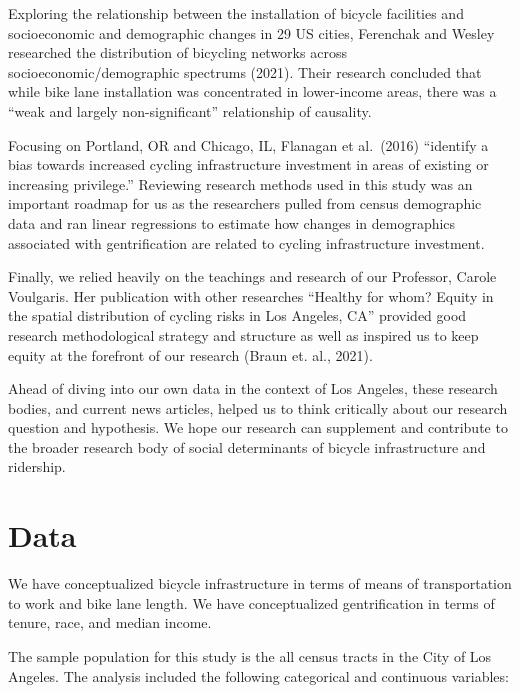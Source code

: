 \documentclass[
]{article}
\begin{document}
Exploring the relationship between the installation of bicycle
facilities and socioeconomic and demographic changes in 29 US cities,
Ferenchak and Wesley researched the distribution of bicycling networks
across socioeconomic/demographic spectrums (2021). Their research
concluded that while bike lane installation was concentrated in
lower-income areas, there was a ``weak and largely non-significant''
relationship of causality.

Focusing on Portland, OR and Chicago, IL, Flanagan et al.~(2016)
``identify a bias towards increased cycling infrastructure investment in
areas of existing or increasing privilege.'' Reviewing research methods
used in this study was an important roadmap for us as the researchers
pulled from census demographic data and ran linear regressions to
estimate how changes in demographics associated with gentrification are
related to cycling infrastructure investment.

Finally, we relied heavily on the teachings and research of our
Professor, Carole Voulgaris. Her publication with other researches
``Healthy for whom? Equity in the spatial distribution of cycling risks
in Los Angeles, CA'' provided good research methodological strategy and
structure as well as inspired us to keep equity at the forefront of our
research (Braun et. al., 2021).

Ahead of diving into our own data in the context of Los Angeles, these
research bodies, and current news articles, helped us to think
critically about our research question and hypothesis. We hope our
research can supplement and contribute to the broader research body of
social determinants of bicycle infrastructure and ridership.

\hypertarget{data}{%
\section{Data}\label{data}}

We have conceptualized bicycle infrastructure in terms of means of
transportation to work and bike lane length. We have conceptualized
gentrification in terms of tenure, race, and median income.

The sample population for this study is the all census tracts in the
City of Los Angeles. The analysis included the following categorical and
continuous variables:
\end{document}
